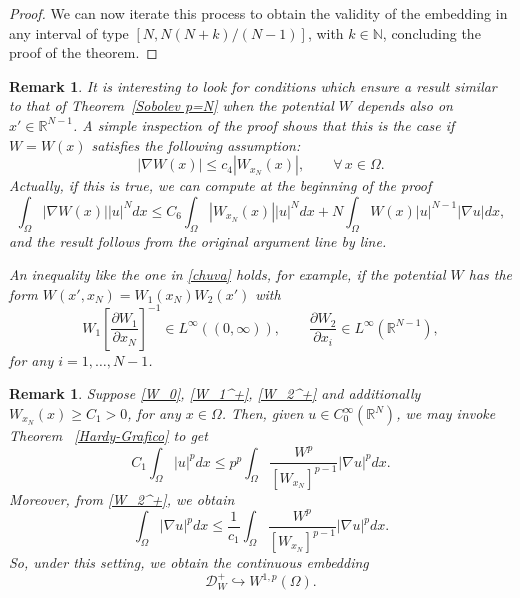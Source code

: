 \documentclass[12pt]{amsart}
\newtheorem{remark}[theorem]{Remark}
\theoremstyle{definition}
\theoremstyle{plain}
\newcommand{\dint}{\int_{\Omega}}
\begin{document}
\begin{proof}
		We can now iterate this process to obtain the validity of the embedding in any interval 
        of type $\left[N,N(N+k)/(N-1)\right]$,  with $k \in \mathbb{N}$, concluding the 
        proof of the theorem.
	\end{proof}

    \begin{remark} \label{chuva-sem-x'}
        It is interesting to look for conditions which ensure a result similar to that 
        of Theorem~\ref{Sobolev p=N} when the potential $W$ depends also on 
        $x' \in \mathbb{R}^{N-1}$. A simple inspection of the proof shows that 
        this is the case if $W=W(x)$ satisfies the following assumption:
\begin{equation} \label{chuva}
    |\nabla W(x)| \leq c_4|W_{x_N}(x)|, \qquad \forall \, x \in \Omega.
\end{equation}
Actually, if this is true, we can compute at the beginning of the proof
$$
\dint |\nabla W(x)||u|^N dx \leq C_6 \dint |W_{x_N}(x)||u|^N dx + 
N \dint W(x)|u|^{N-1}|\nabla u| dx,
$$
and the result follows from the original argument line by line.

An inequality like the one in \eqref{chuva} holds, for example, if the potential $W$ 
has the  form $W(x', x_N) = W_1(x_N)W_2(x')$  with 
        $$
        W_1 \left[ \frac{\partial W_1}{\partial x_N}    \right]^{-1} \in  
        L^\infty((0,\infty)), \qquad \frac{\partial W_2}{\partial x_i} \in 
        L^\infty(\mathbb{R}^{N-1}),  
        $$
        for any $i=1,\ldots,N-1$. 
    \end{remark}

\begin{remark} \label{embedding-in-w1p} Suppose \eqref{W_0}, \eqref{W_1^+}, 
\eqref{W_2^+} and additionally  $W_{x_N}(x) \geq C_1 >0$, for any $x\in \Omega$. Then, 
given $u\in C_0^\infty(\mathbb{R}^N)$, we may invoke  Theorem ~\ref{Hardy-Grafico} to get	
		$$
			C_1 \dint  |u|^pdx 	\leq p^p\dint \frac{W^p}{[W_{x_N}]^{p-1}}|\nabla u|^p dx.
		$$
        Moreover, from \eqref{W_2^+}, we obtain
        $$
        \dint |\nabla u|^p dx \leq \frac{1}{c_1} \dint 
        \frac{W^p}{[W_{x_N}]^{p-1}}|\nabla u|^p dx.
        $$
        So, under this setting, we obtain the continuous embedding 
		$$
		\mathcal{D}_W^+\hookrightarrow W^{1,p}(\Omega).
		$$	
\end{remark}
        
\end{document}

